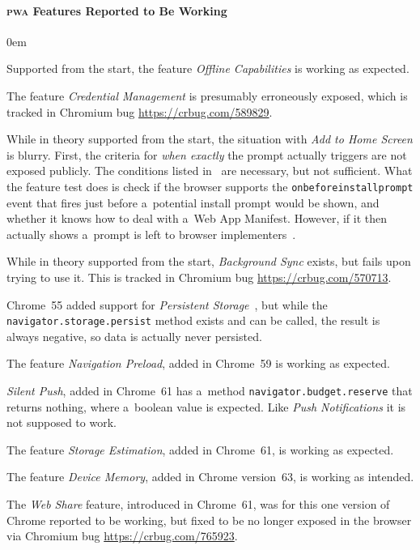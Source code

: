 \documentclass[sigconf]{acmart}
\begin{document}
\paragraph{\textsc{pwa} Features Reported to Be Working}

\begin{description}
  \itemsep0em 
  \item[Offline Capabilities] Supported from the start, the feature \emph{Offline Capabilities}
    is working as expected.
  \item[Credential Management] The feature \emph{Credential Management}
    is presumably erroneously exposed,
     which is tracked in Chromium bug \url{https://crbug.com/589829}.    
  \item[Add to Home Screen] While in theory supported from the start,
    the situation with \emph{Add to Home Screen} is blurry.
    First, the criteria for \emph{when exactly} the prompt actually triggers
    are not exposed publicly. The conditions listed in~\cite{kinlan2017a2hs} are necessary,
    but not sufficient.
    What the feature test does is check if the browser supports the \texttt{onbeforeinstallprompt} event
    that fires just before a~potential install prompt would be shown,
    and whether it knows how to deal
    with a~Web App Manifest.
    However, if it then actually shows a~prompt
    is left to browser implementers~\cite{caceres2017manifest}.
  \item[Background Sync] While in theory supported from the start,
    \emph{Background Sync} exists, but fails upon trying to use it.
    This is tracked in Chromium bug \url{https://crbug.com/570713}.
  \item[Persistent Storage] Chrome~55 added support for
     \emph{Persistent Storage}~\cite{vankesteren2018storage},
     but while the \texttt{navigator.storage.persist} method exists and can be called,
     the result is always negative, so data is actually never persisted.
  \item[Navigation Preload] The feature \emph{Navigation Preload}, added in Chrome~59
    is working as expected.
  \item[Silent Push] \emph{Silent Push}, added in Chrome~61 has a~method
    \texttt{navigator.budget.reserve} that returns nothing, where a~boolean value is expected.
    Like \emph{Push Notifications} it is not supposed to work.
  \item[Storage Estimation] The feature \emph{Storage Estimation}, added in Chrome~61,
    is working as expected.
  \item[Device Memory] The feature \emph{Device Memory}, added in Chrome version~63, 
    is working as intended.
  \item[Web Share] The \emph{Web Share} feature, introduced in Chrome~61,
    was for this one version of Chrome reported to be working, but fixed
    to be no longer exposed in the browser via Chromium bug \url{https://crbug.com/765923}.
\end{description} 
\end{document}
